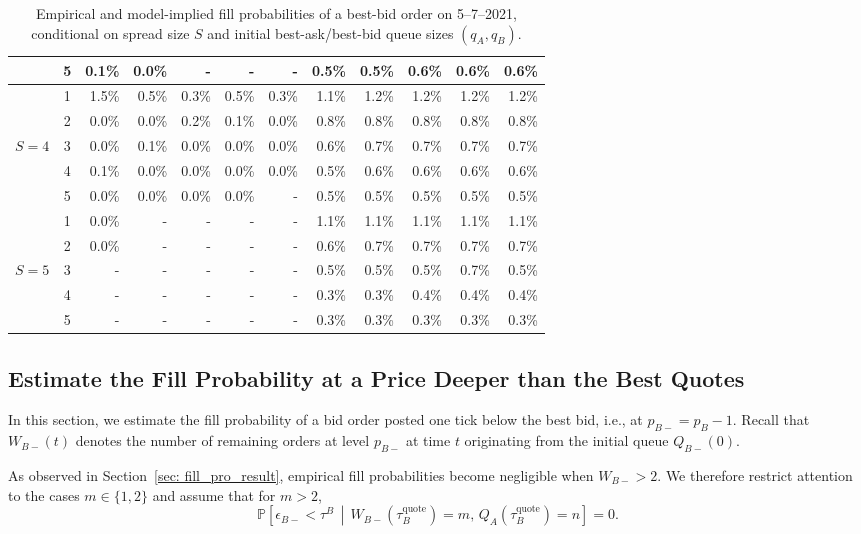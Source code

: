 \documentclass[11pt]{article}
\begin{document}
\begin{table}[!htbp]
\begin{adjustbox}{max width=\textwidth}
\begin{tabular}{c c r r r r r |r r r r r}
             & 5 & 0.1\% & 0.0\% & -      & -  & - & 0.5\% & 0.5\% & 0.6\% & 0.6\% & 0.6\%\\ \midrule
             & 1 & 1.5\% & 0.5\% & 0.3\% & 0.5\% & 0.3\% & 1.1\% & 1.2\% & 1.2\% & 1.2\% & 1.2\%\\
             & 2 & 0.0\% & 0.0\% & 0.2\% & 0.1\% & 0.0\% & 0.8\% & 0.8\% & 0.8\% & 0.8\% & 0.8\%\\
             $S=4$ & 3 &0.0\% & 0.1\% & 0.0\% & 0.0\% & 0.0\% & 0.6\% & 0.7\% & 0.7\% & 0.7\% & 0.7\%\\
             & 4 & 0.1\% & 0.0\% & 0.0\% & 0.0\% & 0.0\% & 0.5\% & 0.6\% & 0.6\% & 0.6\% & 0.6\%\\
             & 5 & 0.0\% & 0.0\% & 0.0\% & 0.0\% & - & 0.5\% & 0.5\% & 0.5\% & 0.5\% & 0.5\%\\\midrule
             & 1 & 0.0\% & - & - & - & - & 1.1\% & 1.1\% & 1.1\% & 1.1\% & 1.1\%\\
             & 2 & 0.0\% & - & - & - & - & 0.6\% & 0.7\% & 0.7\% & 0.7\% & 0.7\%\\
             $S=5$ & 3 & - & - & - & - & - & 0.5\% & 0.5\% & 0.5\% & 0.7\% & 0.5\%\\
             & 4 & - & - & - & - & - & 0.3\% & 0.3\% & 0.4\% & 0.4\% & 0.4\%\\
             & 5 & - & - & - & - & - & 0.3\% & 0.3\% & 0.3\% & 0.3\% & 0.3\%\\\bottomrule
            \end{tabular}
        \end{adjustbox}
        \caption{Empirical and model-implied fill probabilities of a best-bid order on 5--7--2021, conditional on spread size $S$ and initial best-ask/best-bid queue sizes $(q_A,q_B)$.}

     \label{tab: prob_fill_week_before}    
\end{table}


\subsection{Estimate the Fill Probability at a Price Deeper than the Best Quotes}\label{prop_level2_result}

In this section, we estimate the fill probability of a bid order posted one tick below the best bid, i.e., at $p_{B-}=p_B-1$. 
Recall that $W_{B-}(t)$ denotes the number of remaining orders at level $p_{B-}$ at time $t$ originating from the initial queue $Q_{B-}(0)$.

As observed in Section~\ref{sec: fill_pro_result}, empirical fill probabilities become negligible when $W_{B-}>2$. 
We therefore restrict attention to the cases $m\in\{1,2\}$ and assume that for $m>2$,
\begin{equation}
     \mathbb{P}\!\left[\epsilon_{B-}<\tau^B \,\middle|\, W_{B-}(\tau_B^\text{quote})=m,\,
     Q_{A}(\tau_B^\text{quote})=n\right]=0.  
\end{equation}
\end{document}
